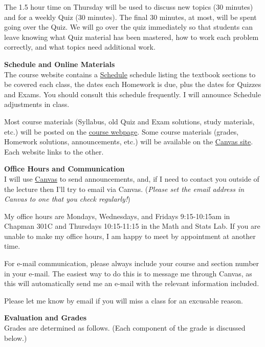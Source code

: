 \documentclass[12pt]{article}
\renewcommand{\emph}[1]{\textsf{\textbf{#1}}}
\newcommand{\localhead}[1]{\par\smallskip\textbf{#1} \smallskip\nobreak\\}%
\def\heading#1{\localhead{\large\emph{#1}}}
\begin{document}
The 1.5 hour time on Thursday will be used to discuss new topics (30
minutes) and for a weekly Quiz (30 minutes).  The final 30 minutes, at
most, will be spent going over the Quiz.  We will go over the quiz
immediately so that students can leave knowing what Quiz material has
been mastered, how to work each problem correctly, and what topics
need additional work.


\clearpage\newpage

\strut

\vspace{-12pt}

\heading{Schedule and Online Materials}
The course website contains a
\href{https://uaf-math.github.io/calc2/assets/general/S25/meek/schedule.pdf}{Schedule}
schedule
listing the textbook sections to be covered each class, the dates each
Homework is due, plus the dates for Quizzes and Exams. You should
consult this schedule frequently.  I will announce Schedule
adjustments in class.

Most course materials (Syllabus, old Quiz and Exam solutions, study materials, etc.) will be posted on the \href{https://uaf-math.github.io/calc2/}{course webpage}.  Some course materials (grades, Homework solutions, announcements, etc.) will be available on the \href{https://canvas.alaska.edu/courses/31682}{Canvas site}.  Each website links to the other.


\heading{Office Hours and Communication}

I will use \href{https://canvas.alaska.edu/courses/31685}{Canvas} to
send announcements, and, if I need to contact you outside of the
lecture then I'll try to email via Canvas.  (\textsl{Please set the
  email address in Canvas to one that you check regularly!})

My office hours are Mondays, Wednesdays,
and Fridays 9:15-10:15am in Chapman 301C and Thursdays 10:15-11:15 in
the
Math and Stats Lab. If you are unable to make my
office hours, I am happy to meet by appointment at another
time.

For e-mail communication, please always include your course and
section number in your e-mail. The easiest way to do this is to
message me through Canvas, as this will automatically send me an
e-mail with the relevant information included.

Please let me know by email if you will miss a class for an excusable reason.

\heading{Evaluation and Grades}
Grades are determined as follows.  (Each component of the grade is discussed below.)
 
\end{document}
